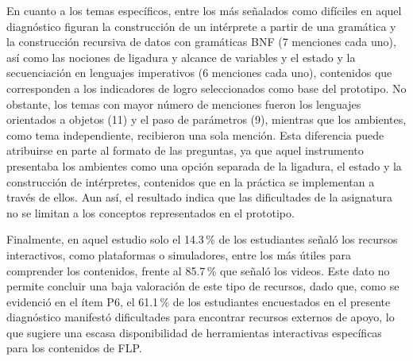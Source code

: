 En cuanto a los temas específicos, entre los más señalados como difíciles en aquel diagnóstico figuran la construcción de un intérprete a partir de una gramática y la construcción recursiva de datos con gramáticas BNF (7 menciones cada uno), así como las nociones de ligadura y alcance de variables y el estado y la secuenciación en lenguajes imperativos (6 menciones cada uno), contenidos que corresponden a los indicadores de logro seleccionados como base del prototipo. No obstante, los temas con mayor número de menciones fueron los lenguajes orientados a objetos (11) y el paso de parámetros (9), mientras que los ambientes, como tema independiente, recibieron una sola mención. Esta diferencia puede atribuirse en parte al formato de las preguntas, ya que aquel instrumento presentaba los ambientes como una opción separada de la ligadura, el estado y la construcción de intérpretes, contenidos que en la práctica se implementan a través de ellos. Aun así, el resultado indica que las dificultades de la asignatura no se limitan a los conceptos representados en el prototipo.

Finalmente, en aquel estudio solo el 14.3\,\% de los estudiantes señaló los recursos interactivos, como plataformas o simuladores, entre los más útiles para comprender los contenidos, frente al 85.7\,\% que señaló los videos. Este dato no permite concluir una baja valoración de este tipo de recursos, dado que, como se evidenció en el ítem P6, el 61.1\,\% de los estudiantes encuestados en el presente diagnóstico manifestó dificultades para encontrar recursos externos de apoyo, lo que sugiere una escasa disponibilidad de herramientas interactivas específicas para los contenidos de FLP.